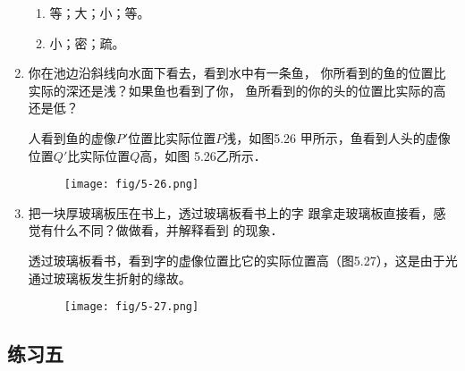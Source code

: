 \begin{enumerate}
    \begin{solution}
\begin{enumerate}
    \item 等；大；小；等。
    \item 小；密；疏。
\end{enumerate}
    \end{solution}
    \item 你在池边沿斜线向水面下看去，看到水中有一条鱼，
    你所看到的鱼的位置比实际的深还是浅？如果鱼也看到了你，
    鱼所看到的你的头的位置比实际的高还是低？

    \begin{solution}
人看到鱼的虚像$P'$位置比实际位置$P$浅，如图5.26
甲所示，鱼看到人头的虚像位置$Q'$比实际位置$Q$高，如图
5.26乙所示．
\begin{figure}[htp]
    \centering
    \texttt{[image: fig/5-26.png]}
    \caption{}
\end{figure}
    \end{solution}
    \item 把一块厚玻璃板压在书上，透过玻璃板看书上的字
    跟拿走玻璃板直接看，感觉有什么不同？做做看，并解释看到
    的现象．

    \begin{solution}
透过玻璃板看书，看到字的虚像位置比它的实际位置高（图5.27），这是由于光通过玻璃板发生折射的缘故。
\begin{figure}[htp]
    \centering
    \texttt{[image: fig/5-27.png]}
    \caption{}
\end{figure}
    \end{solution}
\end{enumerate}



\subsection{练习五}

